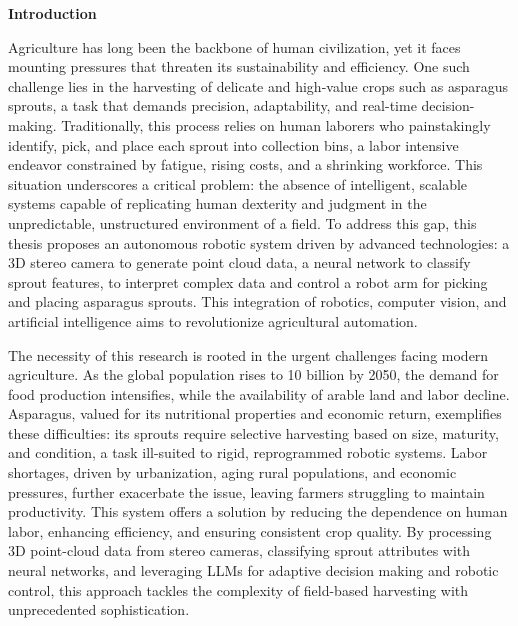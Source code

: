 

{\fontsize{20}{26}\selectfont\textbf{Introduction}}


Agriculture has long been the backbone of human civilization, yet it faces mounting pressures that threaten its sustainability and 
efficiency. One such challenge lies in the harvesting of delicate and high-value crops such as asparagus sprouts, a task that demands 
precision, adaptability, and real-time decision-making. Traditionally, this process relies on human laborers who painstakingly identify, 
pick, and place each sprout into collection bins, a labor intensive endeavor constrained by fatigue, rising costs, and a shrinking 
workforce. This situation underscores a critical problem: the absence of intelligent, scalable systems capable of replicating human 
dexterity and judgment in the unpredictable, unstructured environment of a field. To address this gap, this thesis proposes an autonomous 
robotic system driven by advanced technologies: a 3D stereo camera to generate point cloud data, a neural network to classify sprout 
features,  to interpret complex data and control a robot arm for picking and placing asparagus sprouts. This integration of robotics, 
computer vision, and artificial intelligence aims to revolutionize agricultural automation.


The necessity of this research is rooted in the urgent challenges facing modern agriculture. As the global population rises to 10 
billion by 2050, the demand for food production intensifies, while the availability of arable land and labor decline. Asparagus, 
valued for its nutritional properties and economic return, exemplifies these difficulties: its sprouts require selective harvesting 
based on size, maturity, and condition, a task ill-suited to rigid, reprogrammed robotic systems. Labor shortages, driven by 
urbanization, aging rural populations, and economic pressures, further exacerbate the issue, leaving farmers struggling to maintain 
productivity. This system offers a solution by reducing the dependence on human labor, enhancing efficiency, and ensuring consistent 
crop quality. By processing 3D point-cloud data from stereo cameras, classifying sprout attributes with neural networks, and 
leveraging LLMs for adaptive decision making and robotic control, this approach tackles the complexity of field-based harvesting 
with unprecedented sophistication.


